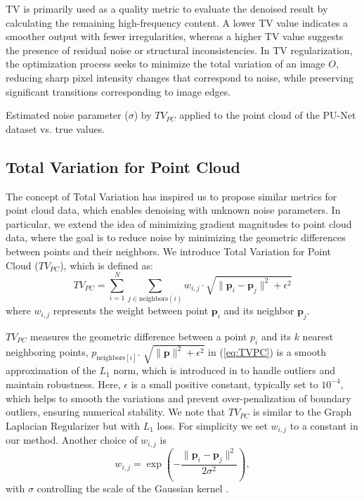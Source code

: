 TV is primarily used as a quality metric to evaluate the denoised result by calculating the remaining high-frequency content. A lower TV value indicates a smoother output with fewer irregularities, whereas a higher TV value suggests the presence of residual noise or structural inconsistencies. In TV regularization, the optimization process seeks to minimize the total variation of an image \( O \), reducing sharp pixel intensity changes that correspond to noise, while preserving significant transitions corresponding to image edges.
\begin{table}[tb]
    \begin{center}
     \resizebox{\columnwidth}{!}{%
     }%
    \end{center}
    \vspace{-0.05in}
    \caption{Estimated noise parameter ($\sigma$) by $TV_{PC}$ applied to the point cloud of the PU-Net \cite{yu2018PUNet} dataset vs. true values.}
    \label{table:sigma}
\end{table}


\subsection{Total Variation for Point Cloud}

The concept of Total Variation has inspired us to propose similar metrics for point cloud data, which enables denoising with unknown noise parameters. In particular, we extend the idea of minimizing gradient magnitudes to point cloud data, where the goal is to reduce noise by minimizing the geometric differences between points and their neighbors. We introduce Total Variation for Point Cloud  ($TV_{PC}$), which is defined as: 
\begin{equation} 
\label{eq:TVPC}
TV_{PC} = \sum_{i=1}^N \sum_{j \in \text{neighbors}(i)} w_{i,j} \cdot \sqrt{\| \mathbf{p}_i - \mathbf{p}_j \|^2 + \epsilon^2}
\end{equation}
where \( w_{i,j} \) represents the weight between point \( \mathbf{p}_i \) and its neighbor \( \mathbf{p}_j \). 

$TV_{PC}$  measures the geometric difference between a point $p_i$ and its $k$ nearest neighboring points, $p_{\text{neighbors}[i]}$.
$\sqrt{\| \mathbf{p} \|^2 + \epsilon^2}$ in (\ref{eq:TVPC}) is a smooth approximation of the \(L_1\) norm, which is introduced in \cite{Charbonnier} to handle outliers and maintain robustness. Here, $\epsilon$ is a small positive constant, typically set to $10^{-4}$, which helps to smooth the variations and prevent over-penalization of boundary outliers, ensuring numerical stability. We note that $TV_{PC}$ is similar to the Graph Laplacian Regularizer but with \(L_1\) loss. 
For simplicity we set \( w_{i,j} \) to a constant in our method. Another choice of \( w_{i,j} \) is 
\begin{equation} 
w_{i,j} = \exp\left(-\frac{\| \mathbf{p}_i - \mathbf{p}_j \|^2}{2\sigma^2}\right),
\end{equation}
with \( \sigma \) controlling the scale of the Gaussian kernel \cite{chen2022deep} .


